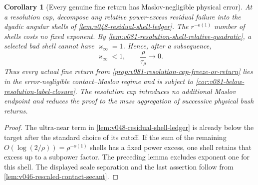 \documentclass[10pt]{article}
\newtheorem{corollary}[theorem]{Corollary}
\begin{document}
\begin{corollary}[Every genuine fine return has Maslov-negligible physical error]
\label{cor:v081-fine-return-error-negligible}
At a resolution cap, decompose any relative power-excess residual failure into the dyadic angular
shells of \cref{lem:v048-residual-shell-ledger}.  The \(r^{-o(1)}\) number of shells costs no fixed
exponent.  By
\cref{lem:v081-resolution-shell-relative-quadratic}, a selected bad shell cannot have
\(\varkappa_\infty=1\).  Hence, after a subsequence,
\[
\varkappa_\infty<1,
\qquad
\frac{\rho}{\tau_\rho}\longrightarrow0.
\]
Thus every actual fine return from
\cref{prop:v081-resolution-cap-freeze-or-return} lies in the error-negligible contact--Maslov
regime and is subject to
\cref{cor:v081-below-resolution-label-closure}.  The resolution cap introduces no additional Maslov endpoint and reduces the proof to the mass aggregation of successive physical bush returns.
\end{corollary}

\begin{proof}
The ultra-near term in
\cref{lem:v048-residual-shell-ledger} is already below the target after the standard choice of its
cutoff.  If the sum of the remaining \(O(\log(2/\rho))=\rho^{-o(1)}\) shells has a fixed power
excess, one shell retains that excess up to a subpower factor.  The preceding lemma excludes
exponent one for this shell.  The displayed scale separation and the last assertion follow from
\cref{lem:v046-rescaled-contact-secant}.
\end{proof}
\end{document}
